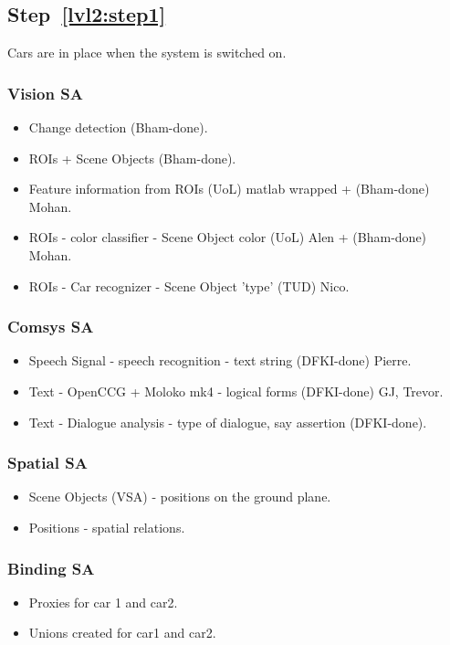\documentclass{article}
\begin{document}
\subsection{Step~\ref{lvl2:step1}}
Cars are in place when the system is switched on.

\subsubsection{Vision SA}
\begin{itemize}
\item Change detection (Bham-done).
\item ROIs + Scene Objects (Bham-done).
\item Feature information from ROIs (UoL) matlab wrapped + (Bham-done) Mohan.
\item ROIs - color classifier - Scene Object color (UoL) Alen + (Bham-done) Mohan.
\item ROIs - Car recognizer - Scene Object 'type' (TUD) Nico.
\end{itemize}

\subsubsection{Comsys SA}
\begin{itemize}
\item Speech Signal - speech recognition - text string (DFKI-done) Pierre.
\item Text - OpenCCG + Moloko mk4 - logical forms (DFKI-done) GJ, Trevor.
\item Text - Dialogue analysis - type of dialogue, say assertion (DFKI-done).
\end{itemize}

\subsubsection{Spatial SA}
\begin{itemize}
\item Scene Objects (VSA) - positions on the ground plane.
\item Positions - spatial relations.
\end{itemize}

\subsubsection{Binding SA}
\begin{itemize}
\item Proxies for car 1 and car2.
\item Unions created for car1 and car2.
\end{itemize}
\end{document}

